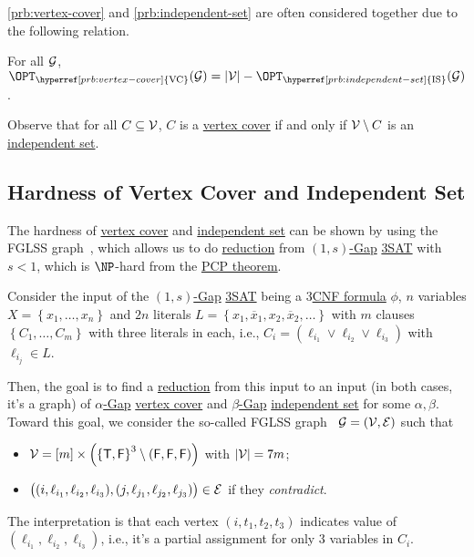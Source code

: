 \autoref{prb:vertex-cover} and \autoref{prb:independent-set} are often considered together due to the following relation.

\begin{claim}
	For all \(\mathcal{\MakeUppercase{g}} \), \(\OPT_{\hyperref[prb:vertex-cover]{\text{VC}}}(\mathcal{\MakeUppercase{g}} ) = \vert \mathcal{\MakeUppercase{v}} \vert - \OPT_{\hyperref[prb:independent-set]{\text{IS}}}(\mathcal{\MakeUppercase{g}} )\).
\end{claim}
\begin{explanation}
	Observe that for all \(C \subseteq \mathcal{\MakeUppercase{v}} \), \(C\) is a \hyperref[prb:vertex-cover]{vertex cover} if and only if \(\mathcal{\MakeUppercase{v}} \setminus C\) is an \hyperref[prb:independent-set]{independent set}.
\end{explanation}

\subsection{Hardness of Vertex Cover and Independent Set}
The hardness of \hyperref[prb:vertex-cover]{vertex cover} and \hyperref[prb:independent-set]{independent set} can be shown by using the FGLSS graph~\cite{10.1145/226643.226652}, which allows us to do \hyperref[def:reduction]{reduction} from \hyperref[def:c-s-Gap]{\((1, s)\)-Gap} \hyperref[prb:max-3SAT]{3SAT} with \(s < 1\), which is \(\NP\)-hard from the \hyperref[thm:PCP]{PCP theorem}.

Consider the input of the \hyperref[def:c-s-Gap]{\((1, s)\)-Gap} \hyperref[prb:max-3SAT]{3SAT} being a \hyperref[def:k-CNF]{\(3\)CNF formula} \(\phi \), \(n\) variables \(X=\left\{ x_1, \ldots , x_n\right\}\) and \(2n\) literals \(L = \left\{ x_1, \overline{x}_1, x_2, \overline{x}_2, \ldots \right\}\) with \(m\) clauses \(\left\{ C_1, \ldots , C_m \right\} \) with three literals in each, i.e., \(C_i = (\ell _{i_1} \lor \ell _{i_2} \lor \ell _{i_3}) \) with \(\ell _{i_j}\in L\).

Then, the goal is to find a \hyperref[def:reduction]{reduction} from this input to an input (in both cases, it's a graph) of \hyperref[def:Gap]{\(\alpha\)-Gap} \hyperref[prb:vertex-cover]{vertex cover} and \hyperref[def:Gap]{\(\beta \)-Gap} \hyperref[prb:independent-set]{independent set} for some \(\alpha , \beta \). Toward this goal, we consider the so-called FGLSS graph~\cite{10.1145/226643.226652} \(\mathcal{\MakeUppercase{g}} =(\mathcal{\MakeUppercase{v}} , \mathcal{\MakeUppercase{e}} )\) such that
\begin{itemize}
	\item \(\mathcal{\MakeUppercase{v}} = [m]\times \left( \left\{ \textsf{T}, \textsf{F} \right\} ^3 \setminus (\textsf{F}, \textsf{F}, \textsf{F}) \right)\) with \(\vert \mathcal{\MakeUppercase{v}}  \vert = 7m\);
	\item \(\big((i, \ell _{i_1}, \ell _{i_2}, \ell _{i_3}), (j, \ell _{j_1}, \ell _{j_2}, \ell _{j_3})\big)\in \mathcal{\MakeUppercase{e}} \) if they \emph{contradict}.
\end{itemize}
The interpretation is that each vertex \((i, t_1, t_2, t_3)\) indicates value of \((\ell _{i_1}, \ell _{i_2}, \ell _{i_3})\), i.e., it's a partial assignment for only \(3\) variables in \(C_i\).

